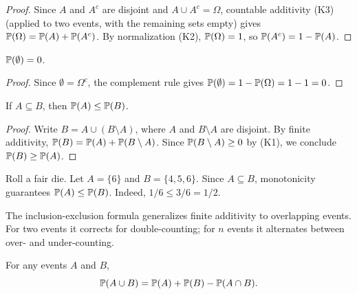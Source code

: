 \documentclass[11pt,a4paper]{article}
\begin{document}
\begin{proof}
Since $A$ and $A^c$ are disjoint and $A \cup A^c = \Omega$, countable
additivity (K3) (applied to two events, with the remaining sets empty)
gives $\mathbb{P}(\Omega) = \mathbb{P}(A) + \mathbb{P}(A^c)$. By normalization (K2),
$\mathbb{P}(\Omega) = 1$, so $\mathbb{P}(A^c) = 1 - \mathbb{P}(A)$.
\end{proof}

\begin{corollary}[$\Prob(\emptyset) = 0$]
\label{cor:empty_set}
$\Prob(\emptyset) = 0$.
\end{corollary}

\begin{proof}
Since $\emptyset = \Omega^c$, the complement rule gives
$\mathbb{P}(\emptyset) = 1 - \mathbb{P}(\Omega) = 1 - 1 = 0$.
\end{proof}

\begin{proposition}[Monotonicity]
\label{prop:monotonicity}
If $A \subseteq B$, then $\mathbb{P}(A) \leq \mathbb{P}(B)$.
\end{proposition}

\begin{proof}
Write $B = A \cup (B \setminus A)$, where $A$ and $B \setminus A$ are
disjoint. By finite additivity,
$\mathbb{P}(B) = \mathbb{P}(A) + \mathbb{P}(B \setminus A)$. Since
$\mathbb{P}(B \setminus A) \geq 0$ by (K1), we conclude
$\mathbb{P}(B) \geq \mathbb{P}(A)$.
\end{proof}

\begin{example}
\label{ex:monotonicity_app}
Roll a fair die. Let $A = \{6\}$ and $B = \{4, 5, 6\}$. Since
$A \subseteq B$, monotonicity guarantees $\mathbb{P}(A) \leq \mathbb{P}(B)$.
Indeed, $1/6 \leq 3/6 = 1/2$.
\end{example}

\begin{keyresult}[title={Inclusion-Exclusion Principle}]
The inclusion-exclusion formula generalizes finite additivity to
overlapping events. For two events it corrects for double-counting;
for $n$ events it alternates between over- and under-counting.
\end{keyresult}

\begin{theorem}
\label{thm:ie_two}
For any events $A$ and $B$,
\[
    \mathbb{P}(A \cup B) = \mathbb{P}(A) + \mathbb{P}(B) - \mathbb{P}(A \cap B).
\]
\end{theorem}
\end{document}
